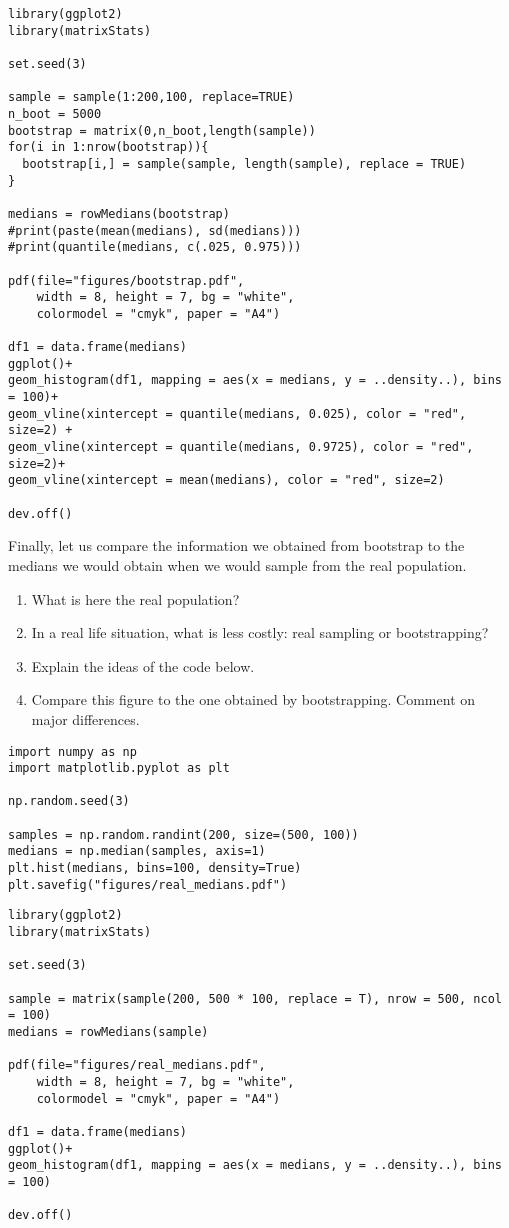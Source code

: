 \begin{verbatim}
library(ggplot2)
library(matrixStats)

set.seed(3)

sample = sample(1:200,100, replace=TRUE)
n_boot = 5000
bootstrap = matrix(0,n_boot,length(sample))
for(i in 1:nrow(bootstrap)){
  bootstrap[i,] = sample(sample, length(sample), replace = TRUE)
}

medians = rowMedians(bootstrap)
#print(paste(mean(medians), sd(medians)))
#print(quantile(medians, c(.025, 0.975)))

pdf(file="figures/bootstrap.pdf",
    width = 8, height = 7, bg = "white",
    colormodel = "cmyk", paper = "A4")

df1 = data.frame(medians)
ggplot()+
geom_histogram(df1, mapping = aes(x = medians, y = ..density..), bins = 100)+
geom_vline(xintercept = quantile(medians, 0.025), color = "red", size=2) +
geom_vline(xintercept = quantile(medians, 0.9725), color = "red", size=2)+
geom_vline(xintercept = mean(medians), color = "red", size=2)

dev.off()
\end{verbatim}

\begin{exercise}
Finally, let us compare the information we obtained from bootstrap to the medians we would obtain when we would sample from the real population.
\begin{enumerate}
\item What is here the real population?
\item In a real life situation, what is less costly: real sampling or bootstrapping?
\item Explain the ideas of the code below.
\item Compare this figure to the one obtained by bootstrapping. Comment on major differences.
\end{enumerate}
\begin{verbatim}
import numpy as np
import matplotlib.pyplot as plt

np.random.seed(3)

samples = np.random.randint(200, size=(500, 100))
medians = np.median(samples, axis=1)
plt.hist(medians, bins=100, density=True)
plt.savefig("figures/real_medians.pdf")
\end{verbatim}

\begin{verbatim}
library(ggplot2)
library(matrixStats)

set.seed(3)

sample = matrix(sample(200, 500 * 100, replace = T), nrow = 500, ncol = 100)
medians = rowMedians(sample)

pdf(file="figures/real_medians.pdf",
    width = 8, height = 7, bg = "white",
    colormodel = "cmyk", paper = "A4")

df1 = data.frame(medians)
ggplot()+
geom_histogram(df1, mapping = aes(x = medians, y = ..density..), bins = 100)

dev.off()
\end{verbatim}
\end{exercise}





